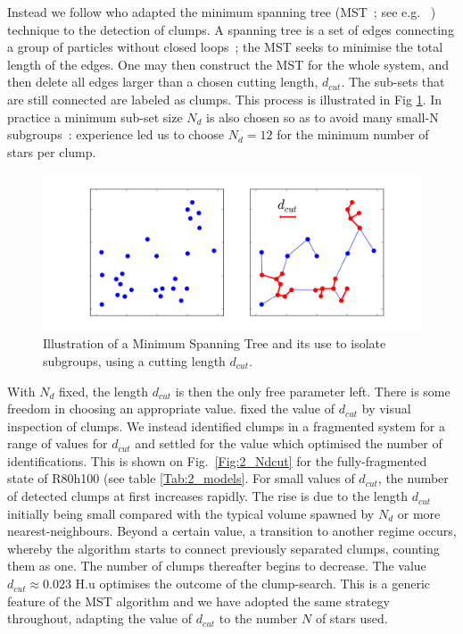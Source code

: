 Instead we follow \cite{Maschberger2010} who adapted the minimum spanning tree (MST~; see e.g. ~\citealt{Allison2009b,Olczak2011}) technique to the detection of clumps. A spanning tree is a set of edges connecting a group of  particles without closed loops~; the MST seeks to minimise the total length of the edges. One may then construct the MST for the whole system, and then delete all edges larger than a chosen cutting length, $d_{cut}$. The sub-sets that are still connected  are labeled as clumps. This process is illustrated in Fig \ref{Fig:2_MST}. In practice a minimum sub-set size $N_d$  is also chosen so as to avoid many small-N subgroups~: experience led us to choose  $N_d = 12$ for the minimum number of stars per clump. 

\begin{figure}
\begin{center}
\includegraphics[width=0.8\columnwidth]{Figures/2_MST.png}
\end{center}
\caption{Illustration of a Minimum Spanning Tree and its use to isolate subgroups, using a cutting length $d_{cut}$.}
\label{Fig:2_MST}
\end{figure}


With $N_d$ fixed, the length $d_{cut}$ is then the only free parameter left. There is some freedom 
in choosing an appropriate value. \cite{Maschberger2010} fixed the value of  $d_{cut}$ by visual inspection of clumps.  We instead  identified  clumps in a fragmented system for a range of values for $d_{cut}$ and settled for the value  which optimised the number of identifications. This is shown on Fig.~\ref{Fig:2_Ndcut} for the fully-fragmented state of R80h100 (see table \ref{Tab:2_models}. For small values of $d_{cut}$, the number of detected clumps at first  increases rapidly. The rise is due  to the length $d_{cut}$ initially being small compared with the typical volume spawned by $N_d$ or more  nearest-neighbours. Beyond a certain value, a transition to another regime occurs, whereby the algorithm starts to connect previously separated clumps, counting them as one. The number of clumps thereafter begins to decrease. The value $d_{cut} \approx 0.023$ H.u optimises the outcome of the clump-search. This is a generic feature of the MST algorithm and we have adopted the same strategy throughout, adapting the value of $d_{cut}$ to the number $N$ of stars used. 





